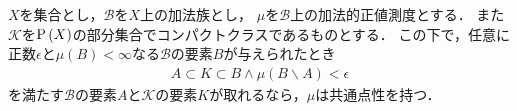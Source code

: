 		\begin{screen}
			\begin{thm}[測度有限な集合がコンパクトクラスで近似されるなら共通点性を持つ]
			\label{thm:finite_intersection_property_and_common_point_property}
				$X$を集合とし，$\mathcal{B}$を$X$上の加法族とし，
				$\mu$を$\mathcal{B}$上の加法的正値測度とする．
				また$\mathcal{K}$を$\operatorname*{P} \left(X\right)$の部分集合でコンパクトクラスであるものとする．
				この下で，任意に正数$\epsilon$と$\mu(B) < \infty$なる$\mathcal{B}$の要素$B$が与えられたとき
				\begin{align}
					A \subset K \subset B \wedge \mu(B \backslash A )< \epsilon
				\end{align}
				を満たす$\mathcal{B}$の要素$A$と$\mathcal{K}$の要素$K$が取れるなら，$\mu$は共通点性を持つ．
			\end{thm}
		\end{screen}
		
